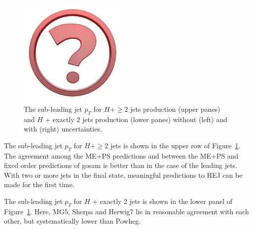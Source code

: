\begin{figure}[t!]
  \hfill
  \includegraphics[width=0.47\textwidth]{Micon.pdf}
  \caption{
    The sub-leading jet $p_T$ for $H+\ge2$ jets production (upper
    panes) and $H$ + exactly 2 jets production (lower panes) without
    (left) and with (right) uncertainties.
    \label{fig:higgscomp:results:2obs:jet2_pt}
  }
\end{figure}

The sub-leading jet $p_T$ for $H+\ge2$ jets is shown in the upper row
of Figure~\ref{fig:higgscomp:results:2obs:jet2_pt}.  The agreement
among the ME+PS predictions and between the ME+PS and fixed order
predictions of gosam is better than in the case of the leading
jets. With two or more jets in the final state, meaningful predictions
to HEJ can be made for the first time.

The sub-leading jet $p_T$ for $H$ + exactly 2 jets is shown in the
lower panel of Figure~\ref{fig:higgscomp:results:2obs:jet2_pt}.
Here, MG5, Sherpa and Herwig7 lie in reasonable agreement with each
other, but systematically lower than Powheg.


